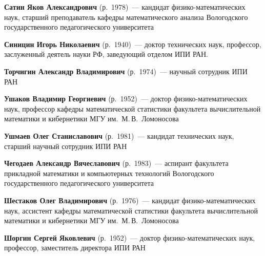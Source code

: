 \begin{multicols}{2}
\vspace*{6pt}


\noindent
\textbf{Сатин Яков Александрович} (р.\ 1978)~--- кандидат
физико-математических наук, старший преподаватель кафедры
математического анализа Вологодского государственного
педагогического университета

\vspace*{9pt}

\noindent %
\textbf{Синицин Игорь Николаевич} (р.\ 1940)~---  доктор технических наук,
профессор, заслуженный деятель науки РФ, заведующий отделом ИПИ РАН.


\vspace*{9pt}

\noindent
\textbf{Торчигин Александр  Владимирович } (р.\ 1974)~--- научный
сотрудник ИПИ РАН

\vspace*{9pt}

\noindent
\textbf{Ушаков Владимир Георгиевич} (р.\ 1952)~--- доктор физико-математических наук,
профессор кафедры математической статистики факультета вычислительной математики и кибернетики МГУ
им.\ М.\,В.~Ломоносова

\vspace*{9pt}

\noindent
\textbf{Ушмаев Олег Станиславович} (р.\ 1981)~---  кандидат
технических наук, старший научный сотрудник ИПИ РАН

\vspace*{9pt}

\noindent
\textbf{Чегодаев Александр Вячеславович} (р.\ 1983)~---  аспирант  факультета
прикладной математики и компьютерных технологий Вологодского
государственного педагогического университета

\vspace*{9pt}

\noindent
\textbf{Шестаков Олег Владимирович} (р.\ 1976)~--- кандидат физико-математических наук,
ассистент ка\-фед\-ры математической статистики факультета вычислительной математики и кибернетики
МГУ им.~М.\,В.~Ломоносова

\vspace*{9pt}

\noindent
\textbf{Шоргин Сергей Яковлевич} (р.\ 1952)~--- доктор физико-математических наук,
профессор, заместитель директора ИПИ РАН







\end{multicols}
